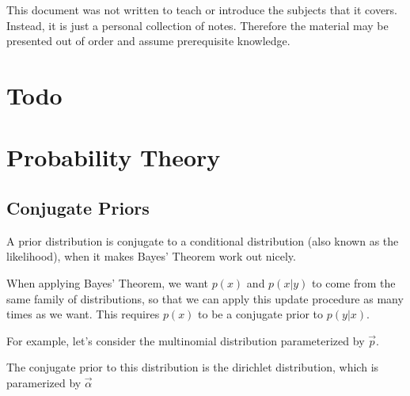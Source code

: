 \documentclass[12pt]{article}
\begin{document}
\maketitle

This document was not written to teach or introduce the subjects that it covers. Instead, it is just a personal collection of notes. Therefore the material may be presented out of order and assume prerequisite knowledge. 

\tableofcontents

\newpage

\section{Todo}

  
\section{Probability Theory}

\subsection{Conjugate Priors}

A prior distribution is conjugate to a conditional distribution (also known as the likelihood), when it makes Bayes' Theorem work out nicely.


When applying Bayes' Theorem, we want $p(x)$ and $p(x|y)$ to come from the same family of distributions, so that we can apply this update procedure as many times as we want. This requires $p(x)$ to be a conjugate prior to $p(y|x)$.

For example, let's consider the multinomial distribution parameterized by $\vec p$.


The conjugate prior to this distribution is the dirichlet distribution, which is paramerized by $\vec \alpha$

\end{document}
